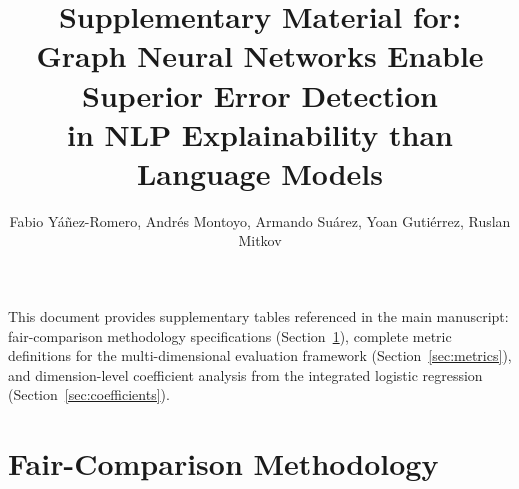 \documentclass[review,12pt]{elsarticle}
\begin{document}
\begin{frontmatter}

\title{Supplementary Material for:\\
Graph Neural Networks Enable Superior Error Detection\\
in NLP Explainability than Language Models}

\author{Fabio Y\'a\~nez-Romero, Andr\'es Montoyo, Armando Su\'arez, Yoan Guti\'errez, Ruslan Mitkov}

\end{frontmatter}

\noindent This document provides supplementary tables referenced in the main manuscript: fair-comparison methodology specifications (Section~\ref{sec:fair_comparison}), complete metric definitions for the multi-dimensional evaluation framework (Section~\ref{sec:metrics}), and dimension-level coefficient analysis from the integrated logistic regression (Section~\ref{sec:coefficients}).

\section{Fair-Comparison Methodology} \label{sec:fair_comparison}
\end{document}
